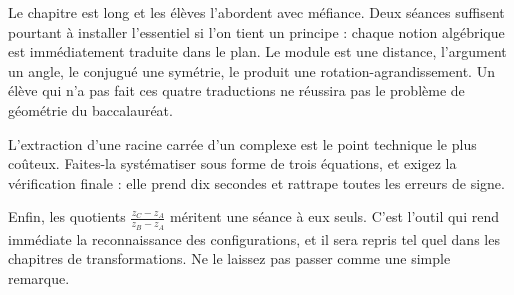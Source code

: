 \begin{notepourlaclasse}
Le chapitre est long et les élèves l'abordent avec méfiance. Deux séances
suffisent pourtant à installer l'essentiel si l'on tient un principe : chaque
notion algébrique est immédiatement traduite dans le plan. Le module est une
distance, l'argument un angle, le conjugué une symétrie, le produit une
rotation-agrandissement. Un élève qui n'a pas fait ces quatre traductions ne
réussira pas le problème de géométrie du baccalauréat.

L'extraction d'une racine carrée d'un complexe est le point technique le plus
coûteux. Faites-la systématiser sous forme de trois équations, et exigez la
vérification finale : elle prend dix secondes et rattrape toutes les erreurs
de signe.

Enfin, les quotients $\frac{z_{C}-z_{A}}{z_{B}-z_{A}}$ méritent une séance à
eux seuls. C'est l'outil qui rend immédiate la reconnaissance des
configurations, et il sera repris tel quel dans les chapitres de
transformations. Ne le laissez pas passer comme une simple remarque.
\end{notepourlaclasse}
